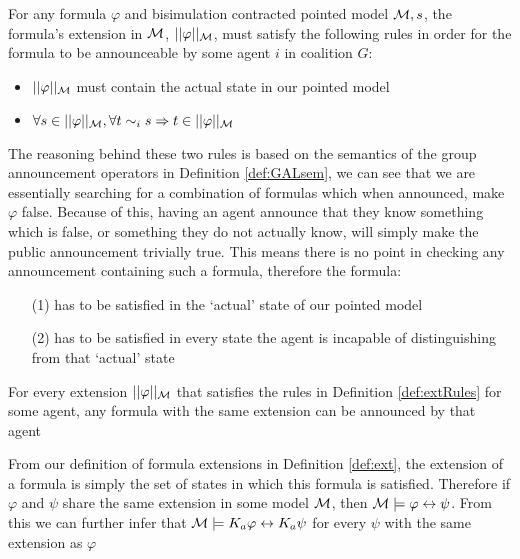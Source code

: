 
\begin{definition}\hfill
\label{def:extRules}
	For any formula $\varphi$ and bisimulation contracted pointed model $\mathcal{M},s$, the formula's extension in $\mathcal{M}$, $||\varphi||_{\mathcal{M}}$, must satisfy the following rules in order for the formula to be announceable by some agent $i$ in coalition $G$:
	\begin{itemize}
		\item $||\varphi||_{\mathcal{M}}$ must contain the actual state in our pointed model
		\item $\forall s\in||\varphi||_{\mathcal{M}}, \forall t\sim_i s \Rightarrow t\in||\varphi||_{\mathcal{M}}$
	\end{itemize}
\end{definition}

The reasoning behind these two rules is based on the semantics of the group announcement operators in Definition \ref{def:GALsem}, we can see that we are essentially searching for a combination of formulas which when announced, make $\varphi$ false. Because of this, having an agent announce that they know something which is false, or something they do not actually know, will simply make the public announcement trivially true. This means there is no point in checking any announcement containing such a formula, therefore the formula:

\begin{itemize}
	\item[(1)] has to be satisfied in the `actual' state of our pointed model
	\item[(2)] has to be satisfied in every state the agent is incapable of distinguishing from that `actual' state
\end{itemize}

\begin{proposition}
For every extension $||\varphi||_{\mathcal{M}}$ that satisfies the rules in Definition \ref{def:extRules} for some agent, any formula with the same extension can be announced by that agent
\end{proposition}

From our definition of formula extensions in Definition \ref{def:ext}, the extension of a formula is simply the set of states in which this formula is satisfied. Therefore if $\varphi$ and $\psi$ share the same extension in some model $\mathcal{M}$, then $\mathcal{M}\models\varphi \leftrightarrow \psi$. From this we can further infer that $\mathcal{M}\models K_a\varphi \leftrightarrow K_a\psi$ for every $\psi$ with the same extension as $\varphi$


